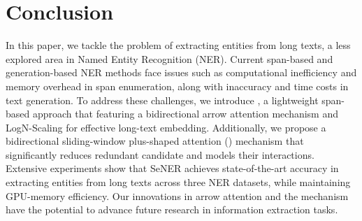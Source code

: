 \section{Conclusion} 
In this paper, we tackle the problem of extracting entities from long texts, a less explored area in Named Entity Recognition (NER).  
Current span-based and generation-based NER methods face issues such as computational inefficiency and memory overhead in span enumeration, along with inaccuracy and time costs in text generation. 
To address these challenges, we introduce \model, a lightweight span-based approach that featuring a bidirectional arrow attention mechanism and LogN-Scaling for effective long-text embedding. 
Additionally, we propose a bidirectional sliding-window plus-shaped attention (\biswa) mechanism that significantly reduces redundant candidate \tokenspans and models their interactions. 
Extensive experiments show that SeNER achieves state-of-the-art accuracy in extracting entities from long texts across three NER datasets, while maintaining GPU-memory efficiency.
 Our innovations in arrow attention and the \biswa mechanism have the potential to advance future research in information extraction tasks.